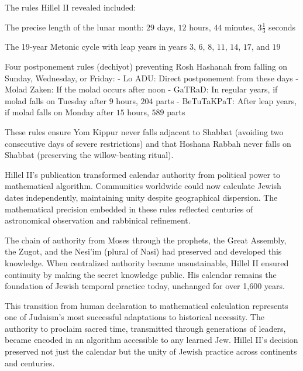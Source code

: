 \begin{historical}
The rules Hillel II revealed included:

The precise length of the lunar month: $29$ days, $12$ hours, $44$ minutes, $3\tfrac{1}{3}$ seconds

The 19-year Metonic cycle with leap years in years $3$, $6$, $8$, $11$, $14$, $17$, and $19$

Four postponement rules (dechiyot) preventing Rosh Hashanah from falling on Sunday, Wednesday, or Friday:
- Lo ADU: Direct postponement from these days
- Molad Zaken: If the molad occurs after noon
- GaTRaD: In regular years, if molad falls on Tuesday after $9$ hours, $204$ parts
- BeTuTaKPaT: After leap years, if molad falls on Monday after $15$ hours, $589$ parts

These rules ensure Yom Kippur never falls adjacent to Shabbat (avoiding two consecutive days of severe restrictions) and that Hoshana Rabbah never falls on Shabbat (preserving the willow-beating ritual).

Hillel II's publication transformed calendar authority from political power to mathematical algorithm. Communities worldwide could now calculate Jewish dates independently, maintaining unity despite geographical dispersion. The mathematical precision embedded in these rules reflected centuries of astronomical observation and rabbinical refinement.

The chain of authority from Moses through the prophets, the Great Assembly, the Zugot, and the Nesi'im (plural of Nasi) had preserved and developed this knowledge. When centralized authority became unsustainable, Hillel II ensured continuity by making the secret knowledge public. His calendar remains the foundation of Jewish temporal practice today, unchanged for over 1,600 years.

This transition from human declaration to mathematical calculation represents one of Judaism's most successful adaptations to historical necessity. The authority to proclaim sacred time, transmitted through generations of leaders, became encoded in an algorithm accessible to any learned Jew. Hillel II's decision preserved not just the calendar but the unity of Jewish practice across continents and centuries.
\end{historical}